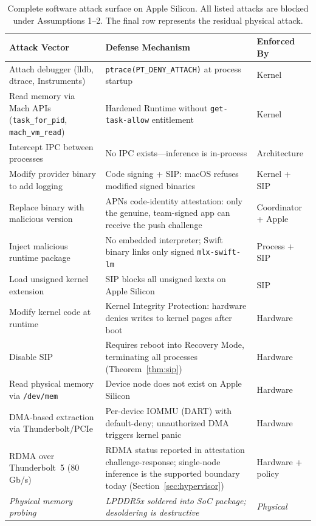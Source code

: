 \documentclass[10pt,twocolumn,letterpaper]{article}
\begin{document}
\begin{table}[t]
\centering
\caption{Complete software attack surface on Apple Silicon. All listed attacks are blocked under Assumptions 1--2. The final row represents the residual physical attack.}
\label{tab:attacks}
\vspace{4pt}
\small
\begin{tabularx}{\textwidth}{@{}lXl@{}}
\toprule
\textbf{Attack Vector} & \textbf{Defense Mechanism} & \textbf{Enforced By} \\
\midrule
Attach debugger (lldb, dtrace, Instruments) & \texttt{ptrace(PT\_DENY\_ATTACH)} at process startup & Kernel \\
Read memory via Mach APIs (\texttt{task\_for\_pid}, \texttt{mach\_vm\_read}) & Hardened Runtime without \texttt{get-task-allow} entitlement & Kernel \\
Intercept IPC between processes & No IPC exists---inference is in-process & Architecture \\
Modify provider binary to add logging & Code signing + SIP: macOS refuses modified signed binaries & Kernel + SIP \\
Replace binary with malicious version & APNs code-identity attestation: only the genuine, team-signed app can receive the push challenge & Coordinator + Apple \\
Inject malicious runtime package & No embedded interpreter; Swift binary links only signed \texttt{mlx-swift-lm} & Process + SIP \\
Load unsigned kernel extension & SIP blocks all unsigned kexts on Apple Silicon & SIP \\
Modify kernel code at runtime & Kernel Integrity Protection: hardware denies writes to kernel pages after boot & Hardware \\
Disable SIP & Requires reboot into Recovery Mode, terminating all processes (Theorem~\ref{thm:sip}) & Hardware \\
Read physical memory via \texttt{/dev/mem} & Device node does not exist on Apple Silicon & Hardware \\
DMA-based extraction via Thunderbolt/PCIe & Per-device IOMMU (DART) with default-deny; unauthorized DMA triggers kernel panic & Hardware \\
RDMA over Thunderbolt~5 (80\,Gb/s) & RDMA status reported in attestation challenge-response; single-node inference is the supported boundary today (Section~\ref{sec:hypervisor}) & Hardware + policy \\
\midrule
\textit{Physical memory probing} & \textit{LPDDR5x soldered into SoC package; desoldering is destructive} & \textit{Physical} \\
\bottomrule
\end{tabularx}
\end{table}
\end{document}
